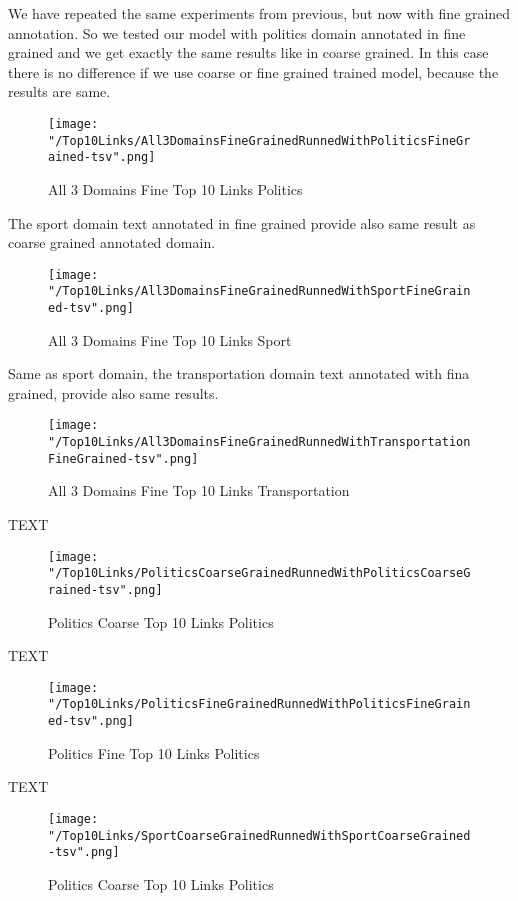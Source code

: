 \documentclass[thesis=M,english]{FITthesis}[2018/05/30]
\begin{document}
	We have repeated the same experiments from previous, but now with fine grained annotation. So we tested our model with politics domain annotated in fine grained and we get exactly the same results like in coarse grained. In this case there is no difference if we use coarse or fine grained trained model, because the results are same.
	\begin{figure}\centering
		\texttt{[image: "/Top10Links/All3DomainsFineGrainedRunnedWithPoliticsFineGrained-tsv".png]}
		\caption{All 3 Domains Fine Top 10 Links Politics}\label{}
	\end{figure}	

	The sport domain text annotated in fine grained provide also same result as coarse grained annotated domain. 
	\begin{figure}\centering
		\texttt{[image: "/Top10Links/All3DomainsFineGrainedRunnedWithSportFineGrained-tsv".png]}
		\caption{All 3 Domains Fine Top 10 Links Sport}\label{}
	\end{figure}
	
	Same as sport domain, the transportation domain text annotated with fina grained, provide also same results.
	\begin{figure}\centering
		\texttt{[image: "/Top10Links/All3DomainsFineGrainedRunnedWithTransportationFineGrained-tsv".png]}
		\caption{All 3 Domains Fine Top 10 Links Transportation}\label{}	
	\end{figure}
	
	TEXT

	\begin{figure}\centering
		\texttt{[image: "/Top10Links/PoliticsCoarseGrainedRunnedWithPoliticsCoarseGrained-tsv".png]}
		\caption{Politics Coarse Top 10 Links Politics}\label{}
	\end{figure}	

	TEXT	

	\begin{figure}\centering
		\texttt{[image: "/Top10Links/PoliticsFineGrainedRunnedWithPoliticsFineGrained-tsv".png]}
		\caption{Politics Fine Top 10 Links Politics}\label{}
	\end{figure}

	
	TEXT

	\begin{figure}\centering
		\texttt{[image: "/Top10Links/SportCoarseGrainedRunnedWithSportCoarseGrained-tsv".png]}
		\caption{Politics Coarse Top 10 Links Politics}\label{}
	\end{figure}		
	
\end{document}
